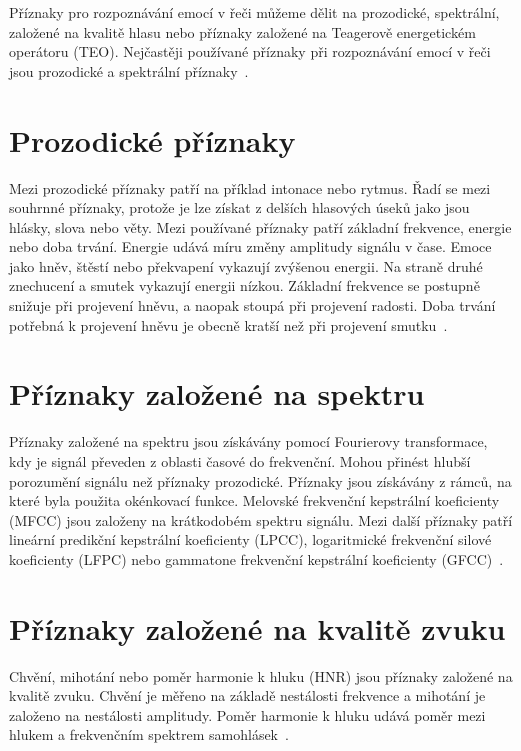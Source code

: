 \documentclass[FM,BP]{tulthesis}
\begin{document}
Příznaky pro rozpoznávání emocí v řeči můžeme dělit na prozodické, spektrální, založené na kvalitě hlasu nebo příznaky založené na Teagerově energetickém operátoru (TEO). Nejčastěji používané příznaky při rozpoznávání emocí v řeči jsou prozodické a spektrální příznaky~\cite{DBLP:journals/speech/AkcayO20}.

\section{Prozodické příznaky}  %
Mezi prozodické příznaky patří na příklad intonace nebo rytmus. Řadí se mezi souhrnné příznaky, protože je lze získat z delších hlasových úseků jako jsou hlásky, slova nebo věty. Mezi používané příznaky patří základní frekvence, energie nebo doba trvání. Energie udává míru změny amplitudy signálu v čase. Emoce jako hněv, štěstí nebo překvapení vykazují zvýšenou energii. Na straně druhé znechucení a smutek vykazují energii nízkou. Základní frekvence se postupně snižuje při projevení hněvu, a naopak stoupá při projevení radosti. Doba trvání potřebná k projevení hněvu je obecně kratší než při projevení smutku~\cite{DBLP:journals/speech/AkcayO20}.

\section{Příznaky založené na spektru}  %
Příznaky založené na spektru jsou získávány pomocí Fourierovy transformace, kdy je signál převeden z oblasti časové do frekvenční. Mohou přinést hlubší porozumění signálu než příznaky prozodické. Příznaky jsou získávány z rámců, na které byla použita okénkovací funkce. Melovské frekvenční kepstrální koeficienty (MFCC) jsou založeny na krátkodobém spektru signálu. Mezi další příznaky patří lineární predikční kepstrální koeficienty (LPCC), logaritmické frekvenční silové koeficienty (LFPC) nebo gammatone frekvenční kepstrální koeficienty (GFCC)~\cite{DBLP:journals/speech/AkcayO20}.

\section{Příznaky založené na kvalitě zvuku}  %
Chvění, mihotání nebo poměr harmonie k hluku (HNR) jsou příznaky založené na kvalitě zvuku. Chvění je měřeno na základě nestálosti frekvence a mihotání je založeno na nestálosti amplitudy. Poměr harmonie k hluku udává poměr mezi hlukem a frekvenčním spektrem samohlásek~\cite{DBLP:journals/speech/AkcayO20}.
\end{document}

